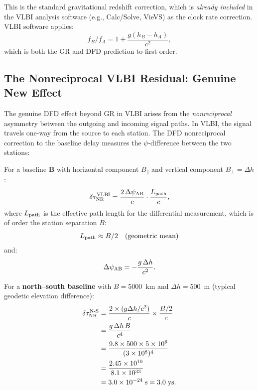 \documentclass[aps,prd,twocolumn,superscriptaddress,nofootinbib]{revtex4-2}
\begin{document}
This is the standard gravitational redshift correction, which is
\emph{already included} in the VLBI analysis software (e.g.,
Calc/Solve, VieVS) as the clock rate correction. VLBI software
applies:
\begin{equation}
f_B/f_A = 1 + \frac{g(h_B - h_A)}{c^2},
\end{equation}
which is both the GR and DFD prediction to first order.

\subsection{The Nonreciprocal VLBI Residual: Genuine New Effect}

The genuine DFD effect beyond GR in VLBI arises from the
\emph{nonreciprocal} asymmetry between the outgoing and incoming
signal paths. In VLBI, the signal travels one-way from the source
to each station. The DFD nonreciprocal correction to the baseline
delay measures the $\psi$-difference between the two stations:

For a baseline $\mathbf{B}$ with horizontal component $B_\parallel$
and vertical component $B_\perp = \Delta h$:
\begin{equation}
\delta\tau_{\rm NR}^{\rm VLBI} = \frac{2\,\Delta\psi_{\rm AB}}{c}
\cdot\frac{L_{\rm path}}{c},
\label{eq:vlbi_NR}
\end{equation}
where $L_{\rm path}$ is the effective path length for the differential
measurement, which is of order the station separation $B$:
\begin{equation}
L_{\rm path} \approx B/2 \quad\text{(geometric mean)}
\end{equation}
and:
\begin{equation}
\Delta\psi_{\rm AB} = -\frac{g\,\Delta h}{c^2}.
\end{equation}

For a \textbf{north--south baseline} with $B = 5000$~km and
$\Delta h = 500$~m (typical geodetic elevation difference):
\begin{align}
\delta\tau_{\rm NR}^{\rm N\text{-}S}
&= \frac{2\times(g\Delta h/c^2)}{c}\times\frac{B/2}{c} \nonumber\\
&= \frac{g\,\Delta h\,B}{c^4} \nonumber\\
&= \frac{9.8\times500\times5\times10^6}{(3\times10^8)^4} \nonumber\\
&= \frac{2.45\times10^{10}}{8.1\times10^{33}} \nonumber\\
&= 3.0\times10^{-24}\;\text{s} = 3.0\;\text{ys}.
\label{eq:vlbi_ns}
\end{align}
\end{document}
